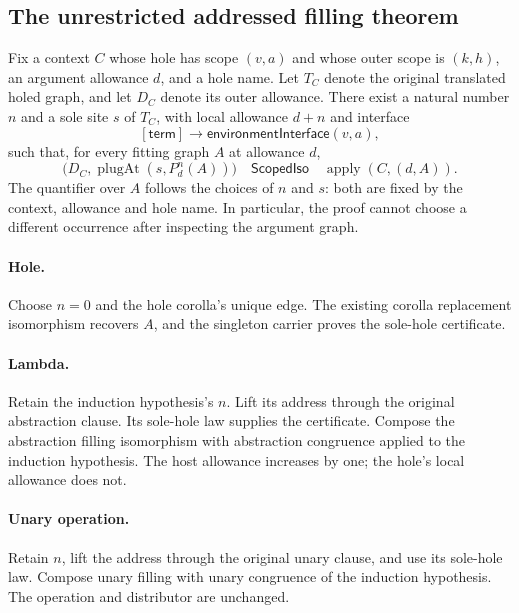
\subsection{The unrestricted addressed filling theorem}

Fix a context $C$ whose hole has scope $(v,a)$ and whose outer scope is
$(k,h)$, an argument allowance $d$, and a hole name. Let $T_C$ denote the
original translated holed graph, and let $D_C$ denote its outer allowance.
There exist a natural number $n$ and a sole site $s$ of $T_C$, with local
allowance $d+n$ and interface
\[
 [\mathsf{term}]\longrightarrow
 \mathsf{environmentInterface}(v,a),
\]
such that, for every fitting graph $A$ at allowance $d$,
\[
 \bigl(D_C,\operatorname{plugAt}(s,P_d^n(A))\bigr)
 \quad\mathrel{\mathsf{ScopedIso}}\quad
 \operatorname{apply}(C,(d,A)).
\]
The quantifier over $A$ follows the choices of $n$ and $s$: both are fixed by
the context, allowance and hole name. In particular, the proof cannot choose
a different occurrence after inspecting the argument graph.

\paragraph{Hole.} Choose $n=0$ and the hole corolla's unique edge. The existing
corolla replacement isomorphism recovers $A$, and the singleton carrier proves
the sole-hole certificate.

\paragraph{Lambda.} Retain the induction hypothesis's $n$. Lift its address
through the original abstraction clause. Its sole-hole law supplies the
certificate. Compose the abstraction filling isomorphism with abstraction
congruence applied to the induction hypothesis. The host allowance increases
by one; the hole's local allowance does not.

\paragraph{Unary operation.} Retain $n$, lift the address through the original
unary clause, and use its sole-hole law. Compose unary filling with unary
congruence of the induction hypothesis. The operation and distributor are
unchanged.

